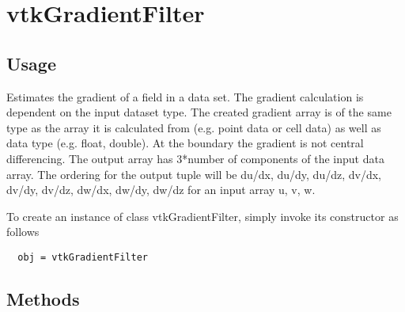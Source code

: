 \section{vtkGradientFilter}

\subsection{Usage}

 Estimates the gradient of a field in a data set.  The gradient calculation
 is dependent on the input dataset type.  The created gradient array
 is of the same type as the array it is calculated from (e.g. point data
 or cell data) as well as data type (e.g. float, double).  At the boundary 
 the gradient is not central differencing.  The output array has 
 3*number of components of the input data array.  The ordering for the 
 output tuple will be {du/dx, du/dy, du/dz, dv/dx, dv/dy, dv/dz, dw/dx,
 dw/dy, dw/dz} for an input array {u, v, w}.

To create an instance of class vtkGradientFilter, simply
invoke its constructor as follows
\begin{verbatim}
  obj = vtkGradientFilter
\end{verbatim}
\subsection{Methods}

